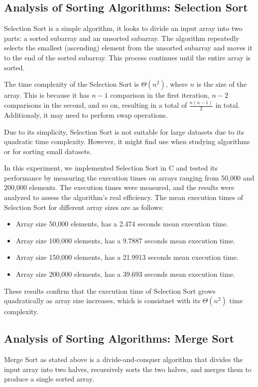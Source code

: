 \documentclass[conference]{IEEEtran}
\begin{document}
\subsection{Analysis of Sorting Algorithms: Selection Sort}
Selection Sort is a simple algorithm, it looks to divide an input array into two parts: a sorted subarray and an unsorted subarray. The algorithm repeatedly selects the smallest (ascending) element from the unsorted subarray and moves it to the end of the sorted subarray. This process continues until the entire array is sorted. 

The time complexity of the Selection Sort is $\Theta(n^2)$, where $n$ is the size of the array. This is because it has $n-1$ comparison in the first iteration, $n-2$ comparisons in the second, and so on, resulting in a total of $\frac{n(n-1)}{2}$ in total. Additionaly, it may need to perform swap operations. 

Due to its simplicity, Selection Sort is not suitable for large datasets due to its quadratic time complexity. However, it might find use when studying algorithms or for sorting small datasets.

In this experiment, we implemented Selection Sort in C and tested its performance by measuring the execution times on arrays ranging from 50,000 and 200,000 elements. The execution times were measured, and the results were analyzed to assess the algorithm's real efficiency. The mean execution times of Selection Sort for different array sizes are as follows:
\begin{itemize}
    \item Array size 50,000 elements, has a 2.474 seconds mean execution time.
    \item Array size 100,000 elements, has a 9.7887 seconds mean execution time.
    \item Array size 150,000 elements, has a 21.9913 seconds mean execution time.
    \item Array size 200,000 elements, has a 39.693 seconds mean execution time.
\end{itemize}

These results confirm that the execution time of Selection Sort grows quadratically as array size increases, which is consistnet with its $\Theta(n^2)$ time complexity. 
\subsection{Analysis of Sorting Algorithms: Merge Sort}
Merge Sort as stated above is a divide-and-conquer algorithm that divides the input array into two halves, recursively sorts the two halves, and merges them to produce a single sorted array. 
\end{document}
